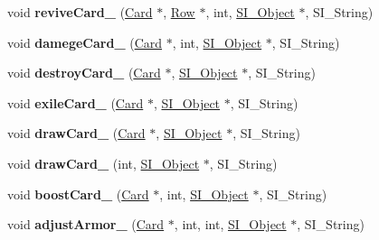 \begin{DoxyCompactItemize}
\item 
\mbox{\label{class_field_aad8669fad3788a8daecd0a496f7e21d8}} 
void {\bfseries revive\+Card\+\_\+} (\hyperlink{class_card}{Card} $\ast$, \hyperlink{class_card_set}{Row} $\ast$, int, \hyperlink{class_s_i___object}{S\+I\+\_\+\+Object} $\ast$, S\+I\+\_\+\+String)
\item 
\mbox{\label{class_field_a90d883d3167022443cc2083fbccfcb0f}} 
void {\bfseries damege\+Card\+\_\+} (\hyperlink{class_card}{Card} $\ast$, int, \hyperlink{class_s_i___object}{S\+I\+\_\+\+Object} $\ast$, S\+I\+\_\+\+String)
\item 
\mbox{\label{class_field_a6f009785e69ed65e5d7e04bf0ace4507}} 
void {\bfseries destroy\+Card\+\_\+} (\hyperlink{class_card}{Card} $\ast$, \hyperlink{class_s_i___object}{S\+I\+\_\+\+Object} $\ast$, S\+I\+\_\+\+String)
\item 
\mbox{\label{class_field_a75989332dc806ff77e30ad9b59b6aded}} 
void {\bfseries exile\+Card\+\_\+} (\hyperlink{class_card}{Card} $\ast$, \hyperlink{class_s_i___object}{S\+I\+\_\+\+Object} $\ast$, S\+I\+\_\+\+String)
\item 
\mbox{\label{class_field_a58fa7fd837297cca03acd75149a28d27}} 
void {\bfseries draw\+Card\+\_\+} (\hyperlink{class_card}{Card} $\ast$, \hyperlink{class_s_i___object}{S\+I\+\_\+\+Object} $\ast$, S\+I\+\_\+\+String)
\item 
\mbox{\label{class_field_a5d2ecc775e14bb17e008a74648a0fab1}} 
void {\bfseries draw\+Card\+\_\+} (int, \hyperlink{class_s_i___object}{S\+I\+\_\+\+Object} $\ast$, S\+I\+\_\+\+String)
\item 
\mbox{\label{class_field_a4465a0e124e100e495b9956956031c35}} 
void {\bfseries boost\+Card\+\_\+} (\hyperlink{class_card}{Card} $\ast$, int, \hyperlink{class_s_i___object}{S\+I\+\_\+\+Object} $\ast$, S\+I\+\_\+\+String)
\item 
\mbox{\label{class_field_abe02c73875f460a482217c19ed9ed880}} 
void {\bfseries adjust\+Armor\+\_\+} (\hyperlink{class_card}{Card} $\ast$, int, int, \hyperlink{class_s_i___object}{S\+I\+\_\+\+Object} $\ast$, S\+I\+\_\+\+String)
\item 

\end{DoxyCompactItemize}
